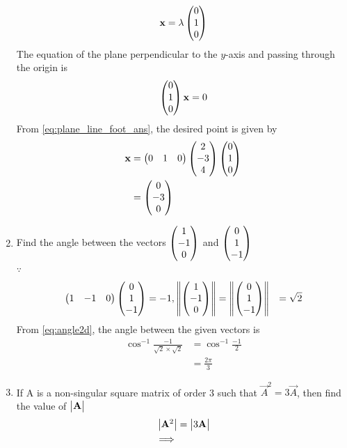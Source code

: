 \documentclass[journal,12pt,twocolumn]{IEEEtran}
\renewcommand\thesection{\arabic{section}}
\begin{document}
\begin{enumerate}[label=\thesection.\arabic*.,ref=\thesection.\theenumi]
\begin{align}
			\mathbf{x} = \lambda 	\begin{pmatrix}0 \\ 1 \\ 0\end{pmatrix} 
		\end{align}
		The equation of the plane perpendicular to the $y$-axis and passing through the origin is
		\begin{align}
 	\begin{pmatrix}0 \\ 1 \\ 0\end{pmatrix} \mathbf{x} = 0
		\end{align}
	From \eqref{eq:plane_line_foot_ans},  the desired point is given by 
\begin{align}
	\mathbf{x} &=   \begin{pmatrix}0 & 1 & 0\end{pmatrix}\begin{pmatrix}2 \\-3 \\4 \end{pmatrix} 
 \begin{pmatrix}0 \\ 1 \\ 0\end{pmatrix} 
 \\
	&=
 \begin{pmatrix}0 \\ -3 \\ 0\end{pmatrix} 
		\end{align}
	\item  Find the angle between the vectors $ \begin{pmatrix}1 \\ -1 \\ 0\end{pmatrix} $ and $ \begin{pmatrix}0 \\ 1 \\ -1\end{pmatrix} $ 
\\
\solution $\because$
%
  \begin{align}
	  \begin{pmatrix}1 & -1 & 0\end{pmatrix} \begin{pmatrix}0 \\ 1 \\ -1\end{pmatrix} &= -1,
	  \left\lVert\begin{pmatrix}1 \\ -1 \\ 0\end{pmatrix}\right\rVert=\left\lVert\begin{pmatrix}0 \\ 1 \\ -1\end{pmatrix}\right\rVert &= \sqrt{2}
  \end{align}
		From 
    \eqref{eq:angle2d}, the angle between the given vectors is 
  \begin{align}
 \cos^{-1}\frac{-1}{\sqrt{2} \times 
\sqrt{2}
	  } &= 
 \cos^{-1}\frac{-1}{2
	  } 
	  \\
	  &= \frac{2\pi}{3}
  \end{align}
\item  If A is a non-singular square matrix of order 3 such that $ \vec{A}^2 =3\vec{ A}$, then find the value of  $\begin{vmatrix}\mathbf{A}\end{vmatrix}$ 
	\\
	\solution 
  \begin{align}
	  \mydet {\vec{A}^2} &=\mydet{3\vec{ A}}
	  \\
	  \implies 

\end{align}
\end{enumerate}
\end{document}
